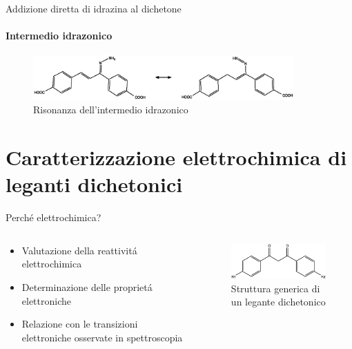 \documentclass{beamer}
\begin{document}
\begin{frame}{Addizione diretta di idrazina al dichetone}
	\framesubtitle{Intermedio idrazonico}

	\begin{figure}[h!]
		\centering
		\includegraphics[width=10cm,keepaspectratio]{../Structures/idrazone.eps}
		\caption{Risonanza dell'intermedio idrazonico}
	\end{figure}


\end{frame}

\section{Caratterizzazione elettrochimica di leganti dichetonici}

\begin{frame}{Perché elettrochimica?}
	\begin{columns}
		\begin{column}{0.5\textwidth}
			\begin{itemize}
				\item Valutazione della reattivitá elettrochimica
				\item Determinazione delle proprietá elettroniche
				\item Relazione con le transizioni elettroniche osservate in spettroscopia
			\end{itemize}
		\end{column}
		\begin{column}{0.5\textwidth}
			\begin{center}
				\begin{itemize}
					\begin{figure}[h!]
						\hspace{-1cm}
						\includegraphics[width=6cm,keepaspectratio]{../Structures/electrochemistry-generic.eps}
						\caption{Struttura generica di un legante dichetonico}
					\end{figure}
				\end{itemize}
			\end{center}
		\end{column}
	\end{columns}
\end{frame}
\end{document}
